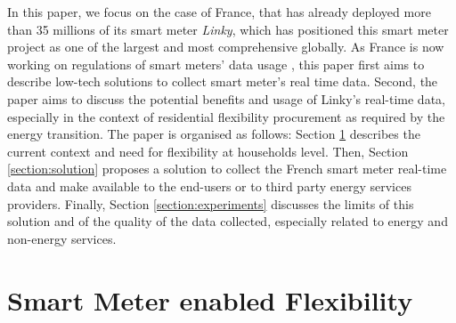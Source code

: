 \documentclass[conference]{IEEEtran}
\begin{document}
In this paper, we focus on the case of France, that has already deployed more than 35 millions of its smart meter \textit{Linky}, which has positioned this smart meter project as one of the largest and most comprehensive globally. As France is now working on regulations of smart meters' data usage \cite{cre:website}, this paper first aims to describe low-tech solutions to collect smart meter's real time data. Second, the paper aims to discuss the potential benefits and usage of Linky's real-time data, especially in the context of residential flexibility procurement as required by the energy transition. 
The paper  is organised as follows: Section \ref{section:needs} describes the current context and need for flexibility at households level. Then, Section \ref{section:solution} proposes a solution to collect the French smart meter real-time data and make available to the end-users or to third party energy services providers. Finally, Section \ref{section:experiments} discusses the limits of this solution and of the quality of the data collected, especially related to energy and non-energy services.

\section{Smart Meter enabled Flexibility}
\label{section:needs}
\end{document}
